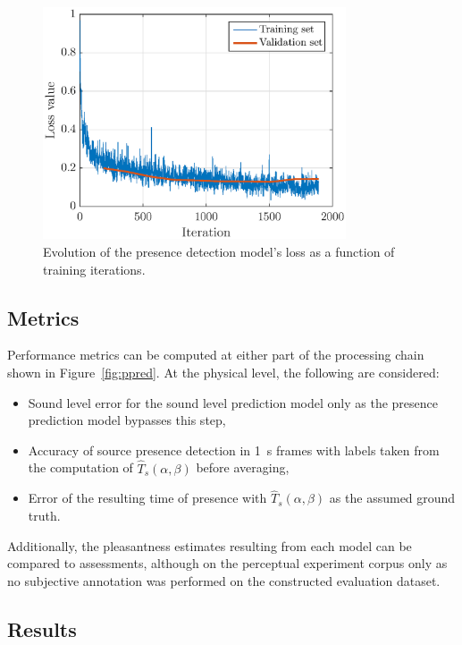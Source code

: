 \documentclass[11pt,a4paper]{article}
\begin{document}
\begin{figure}[!h]
    \centering
    \includegraphics[width=0.8\textwidth]{figures/mdl_loss.eps}
    \caption{Evolution of the presence detection model's loss as a function of training iterations.}\label{fig:mdl_loss}
\end{figure}

\subsection{Metrics}

Performance metrics can be computed at either part of the processing chain shown in Figure~\ref{fig:ppred}. At the physical level, the following are considered:

\begin{itemize}
\item Sound level error for the sound level prediction model only as the presence prediction model bypasses this step,
\item Accuracy of source presence detection in 1~s frames with labels taken from the computation of $\hat T_s(\alpha, \beta)$ before averaging,
\item Error of the resulting time of presence with $\hat T_s(\alpha, \beta)$ as the assumed ground truth.
\end{itemize}

Additionally, the pleasantness estimates resulting from each model can be compared to assessments, although on the perceptual experiment corpus only as no subjective annotation was performed on the constructed evaluation dataset.

\subsection{Results}
\end{document}
